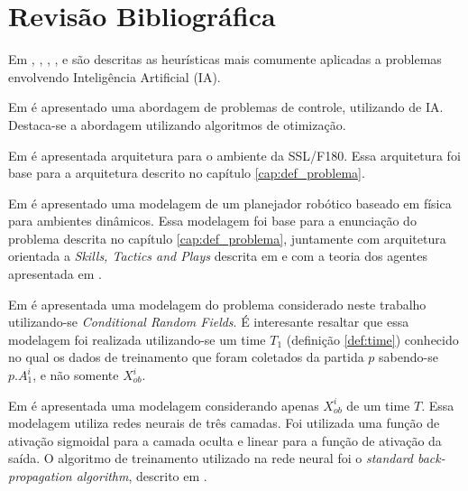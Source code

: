 \chapter{Revisão Bibliográfica}\label{cap:rev_bibliografica}


Em \cite{russellnorvig}, \cite{haykin2001redes}, \cite{kosko1997fuzzy}, \cite{passos2005datamining},
\cite{doringo2004ant} e \cite{bertsimas1993simulated} são descritas as heurísticas
mais comumente aplicadas a problemas envolvendo Inteligência Artificial (IA).

Em \cite{yoneyama2004ia} é apresentado uma abordagem de problemas de controle, utilizando de IA. Destaca-se
a abordagem utilizando algoritmos de otimização.

Em \cite{felixnavarro} é apresentada arquitetura para o ambiente da SSL/F180. Essa arquitetura foi base
para a arquitetura descrito no capítulo \ref{cap:def_problema}.

Em \cite{zickler} é apresentado uma modelagem de um planejador robótico baseado em física para ambientes dinâmicos. 
Essa modelagem foi base para a enunciação do problema descrita no capítulo \ref{cap:def_problema}, juntamente com 
arquitetura orientada a \textit{Skills, Tactics and Plays} descrita em \cite{bowling2003plays} e com a teoria dos 
agentes apresentada em \cite{russellnorvig}.

Em \cite{vail2008crf} é apresentada uma modelagem do problema considerado neste trabalho
utilizando-se \textit{Conditional Random Fields}. É interesante resaltar que essa modelagem
foi realizada utilizando-se um time $T_1$ (definição \ref{def:time}) conhecido no qual os dados
de treinamento que foram coletados da partida $p$ sabendo-se $p.A_1^{i}$, e não somente $X_{ob}^{i}$.

Em \cite{sheng2005motionprediction} é apresentada uma modelagem considerando apenas $X_{ob}^{i}$
de um time $T$. Essa modelagem utiliza redes neurais de três camadas. Foi utilizada
uma função de ativação sigmoidal para a camada oculta e linear para a função de 
ativação da saída. O algoritmo de treinamento utilizado na rede neural foi o \textit{standard back-propagation
algorithm}, descrito em \cite{haykin2001redes}.
